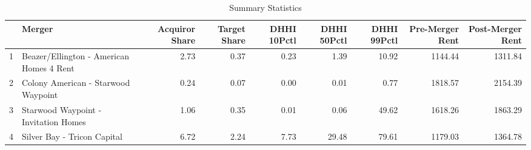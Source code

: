 \begin{table}[ht]
\centering
\begin{tabular}{rlrrrrrrr}
  \hline
 & Merger & Acquiror Share & Target Share & DHHI 10Pctl & DHHI 50Pctl & DHHI 99Pctl & Pre-Merger Rent & Post-Merger Rent \\ 
  \hline
1 & Beazer/Ellington - American Homes 4 Rent & 2.73 & 0.37 & 0.23 & 1.39 & 10.92 & 1144.44 & 1311.84 \\ 
  2 & Colony American - Starwood Waypoint & 0.24 & 0.07 & 0.00 & 0.01 & 0.77 & 1818.57 & 2154.39 \\ 
  3 & Starwood Waypoint - Invitation Homes & 1.06 & 0.35 & 0.01 & 0.06 & 49.62 & 1618.26 & 1863.29 \\ 
  4 & Silver Bay - Tricon Capital & 6.72 & 2.24 & 7.73 & 29.48 & 79.61 & 1179.03 & 1364.78 \\ 
   \hline
\end{tabular}
\caption{Summary Statistics} 
\end{table}
